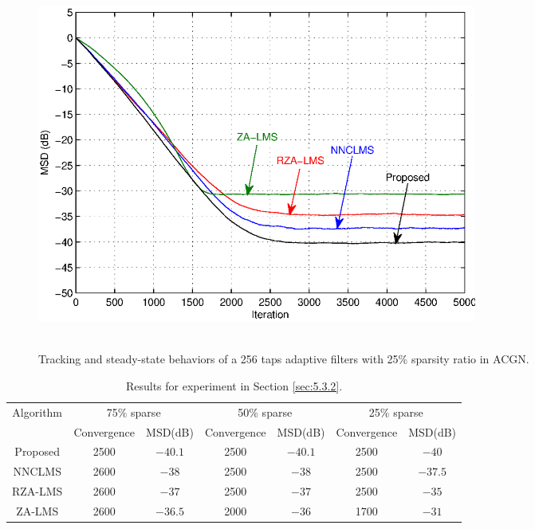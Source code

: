 \begin{figure}[!htb]
\begin{center}
\vspace{1cm}
\includegraphics[width=14.5cm, height=11.5cm]{Figures/Chapter5/fig11.eps}\\
\end{center}
\vspace{-1cm}
\caption{Tracking and steady-state behaviors of a 256 taps adaptive filters with 25\% sparsity ratio in ACGN.}
\label{fig13}
\vspace{1.5cm}
\end{figure}



\begin{table}[!htb]
\centering
\caption{Results for experiment in Section \ref{sec:5.3.2}.}
\vspace{0.5cm}
\begin{tabular}{|c|c|c|c|c|c|c|}
 \hline

  \multirow{2}{*}{Algorithm} & \multicolumn{2}{c|}{75\% sparse} & \multicolumn{2}{c|}{50\% sparse} & \multicolumn{2}{c|}{25\% sparse} \\
  \cline{2-7}
    & Convergence & MSD(dB) & Convergence  & MSD(dB) &Convergence& MSD(dB)\\ \hline
    Proposed & 2500 & $-40.1$ & 2500 & $-40.1$ & 2500  & $-40$ \\ \hline
    NNCLMS  & 2600 & $-38$ & 2500 & $-38$ & 2500  & $-37.5$  \\ \hline
   RZA-LMS & 2600 & $-37$ & 2500 & $-37$ & 2500 & $-35$   \\ \hline
   ZA-LMS & 2600 & $-36.5$ &  2000 & $-36$ & 1700 & $-31$ \\ \hline
  \end{tabular}
  \label{table6}
  \end{table}


